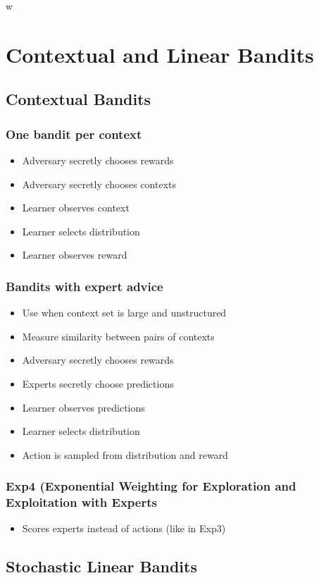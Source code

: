 w\documentclass{article}
\begin{document}
\section{Contextual and Linear Bandits}
\subsection{Contextual Bandits}
\subsubsection{One bandit per context}
\begin{itemize}
	\item Adversary secretly chooses rewards
	\item Adversary secretly chooses contexts
	\item Learner observes context
	\item Learner selects distribution
	\item Learner observes reward
\end{itemize}
\subsubsection{Bandits with expert advice}
\begin{itemize}
	\item Use when context set is large and unstructured
	\item Measure similarity between pairs of contexts
	\item Adversary secretly chooses rewards
	\item Experts secretly choose predictions
	\item Learner observes predictions
	\item Learner selects distribution
	\item Action is sampled from distribution and reward
\end{itemize}
\subsubsection{Exp4 (Exponential Weighting for Exploration and Exploitation with Experts}
\begin{itemize}
	\item Scores experts instead of actions (like in Exp3)
\end{itemize}
\subsection{Stochastic Linear Bandits}
\end{document}
